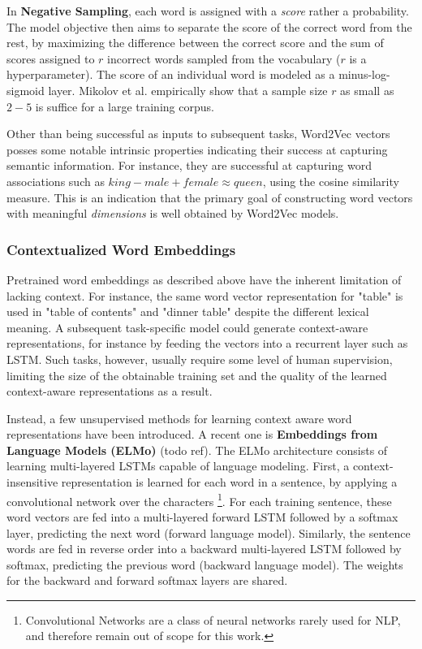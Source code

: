 In \textbf{Negative Sampling}, each word is assigned with a \emph{score} rather a probability. The model objective then aims to separate the score of the correct word from the rest, by maximizing the difference between the correct score and the sum of scores assigned to $r$ incorrect words sampled from the vocabulary ($r$ is a hyperparameter). The score of an individual word is modeled as a minus-log-sigmoid layer. Mikolov et al. empirically show that a sample size $r$ as small as $2 - 5$ is suffice for a large training corpus. 

Other than being successful as inputs to subsequent tasks, Word2Vec vectors posses some notable intrinsic properties indicating their success at capturing semantic information. For instance, they are successful at capturing word associations such as $king - male + female \approx queen$, using the cosine similarity measure. This is an indication that the primary goal of constructing word vectors with meaningful \emph{dimensions} is well obtained by Word2Vec models.

\subsubsection{Contextualized Word Embeddings}
Pretrained word embeddings as described above have the inherent limitation of lacking context. For instance, the same word vector representation for "table" is used in "table of contents" and "dinner table" despite the different lexical meaning. A subsequent task-specific model could generate context-aware representations, for instance by feeding the vectors into a recurrent layer such as LSTM. Such tasks, however, usually require some level of human supervision, limiting the size of the obtainable training set and the quality of the learned context-aware representations as a result. 

Instead, a few unsupervised methods for learning context aware word representations have been introduced. A recent one is \textbf{Embeddings from Language Models (ELMo)} (todo ref). The ELMo architecture consists of learning multi-layered LSTMs capable of language modeling. First, a context-insensitive representation is learned for each word in a sentence, by applying a convolutional network over the characters \footnote{Convolutional Networks are a class of neural networks rarely used for NLP, and therefore remain out of scope for this work.}. For each training sentence, these word vectors are fed into a multi-layered forward LSTM followed by a softmax layer, predicting the next word (forward language model). Similarly, the sentence words are fed in reverse order into a backward multi-layered LSTM followed by softmax, predicting the previous word (backward language model). The weights for the backward and forward softmax layers are shared. 

